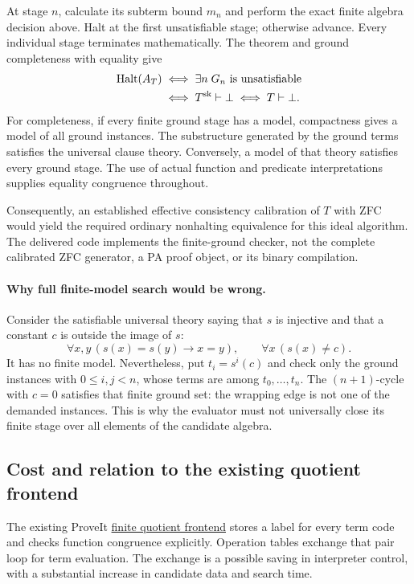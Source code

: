At stage $n$, calculate its subterm bound $m_n$ and perform the exact finite
algebra decision above.  Halt at the first unsatisfiable stage; otherwise
advance.  Every individual stage terminates mathematically.  The theorem and
ground completeness with equality give
\[
 \begin{aligned}
 \operatorname{Halt}(A_T)
 &\iff\exists n\;G_n\text{ is unsatisfiable}\\
 &\iff T^{\rm sk}\vdash\bot
  \iff T\vdash\bot.
 \end{aligned}
\]
For completeness, if every finite ground stage has a model, compactness
gives a model of all ground instances.  The substructure generated by the
ground terms satisfies the universal clause theory.  Conversely, a model
of that theory satisfies every ground stage.  The use of actual function
and predicate interpretations supplies equality congruence throughout.

Consequently, an established effective consistency calibration of $T$ with
ZFC would yield the required ordinary nonhalting equivalence for this ideal
algorithm.  The delivered code implements the finite-ground checker, not
the complete calibrated ZFC generator, a PA proof object, or its binary
compilation.

\paragraph{Why full finite-model search would be wrong.}
Consider the satisfiable universal theory saying that $s$ is injective and
that a constant $c$ is outside the image of $s$:
\[
 \forall x,y\,(s(x)=s(y)\to x=y),\qquad
 \forall x\,(s(x)\ne c).
\]
It has no finite model.  Nevertheless, put $t_i=s^i(c)$ and check only
the ground instances with $0\le i,j<n$, whose terms are among
$t_0,\ldots,t_n$.  The $(n+1)$-cycle with $c=0$ satisfies that finite
ground set: the wrapping edge is not one of the demanded instances.
This is why the evaluator must not universally close its finite stage over
all elements of the candidate algebra.

\subsection{Cost and relation to the existing quotient frontend}

The existing ProveIt
\href{https://github.com/VladimirReshetnikov/ProveIt/blob/d91a27b462cbf7fdc6537739775fd192b06fb769/Computability/BusyBeaver/Research/ZFC/finite_quotient_frontend.md}
{finite quotient frontend} stores a label for every term code and checks
function congruence explicitly.  Operation tables exchange that pair loop
for term evaluation.  The exchange is a possible saving in interpreter
control, with a substantial increase in candidate data and search time.

